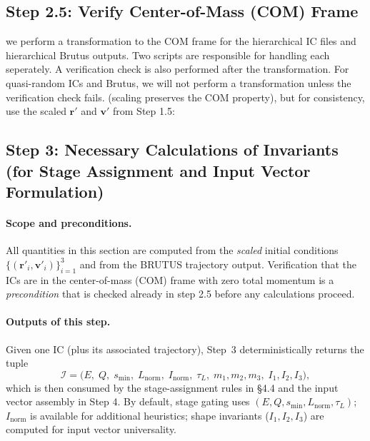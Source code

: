 \subsection{Step 2.5: Verify Center-of-Mass (COM) Frame} 
we perform a transformation to the COM frame for the hierarchical IC files and hierarchical Brutus outputs. Two scripts are responsible for handling
each seperately. A verification check is also performed after the transformation. For quasi-random ICs and Brutus, we will not perform a transformation
unless the verification check fails. 
(scaling preserves the COM property), but for consistency, use the scaled \(\mathbf{r}'\) and \(\mathbf{v}'\) from Step 1.5:











\subsection{Step 3: Necessary Calculations of Invariants (for Stage Assignment and Input Vector Formulation)}
\label{sec:ctl:step3}

\paragraph{Scope and preconditions.}
All quantities in this section are computed from the \emph{scaled} initial conditions
$\{(\mathbf r'_i,\mathbf v'_i)\}_{i=1}^3$ and from the BRUTUS trajectory output.
Verification that the ICs are in the center-of-mass (COM) frame with zero total momentum
is a \emph{precondition} that is checked already in step 2.5 before any calculations proceed.


\paragraph{Outputs of this step.}
Given one IC (plus its associated trajectory), Step~3 deterministically returns the tuple
\[
\mathcal{I} = \big(E,\;Q,\;s_{\min},\;L_{\mathrm{norm}},\;I_{\mathrm{norm}},\; \tau_L,\; m_1, m_2, m_3,\; I_1, I_2, I_3 \big),
\]
which is then consumed by the stage-assignment rules in \S4.4 and the input vector assembly in Step 4. 
By default, stage gating uses $(E,Q,s_{\min},L_{\mathrm{norm}},\tau_L)$; $I_{\mathrm{norm}}$ is available for additional heuristics; 
shape invariants ($I_1, I_2, I_3$) are computed for input vector universality.

